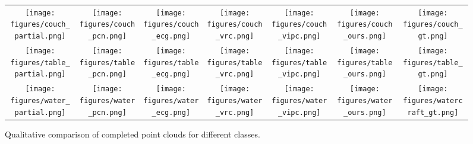 \documentclass{article}
\begin{document}
\begin{figure}
\begin{tabular}{ccccccc}
\\
\texttt{[image: figures/couch\_partial.png]}
   
&
\texttt{[image: figures/couch\_pcn.png]}
   
&
\texttt{[image: figures/couch\_ecg.png]}
   
&
\texttt{[image: figures/couch\_vrc.png]}
   
&
\texttt{[image: figures/couch\_vipc.png]}
   
&
\texttt{[image: figures/couch\_ours.png]}
   
&
\texttt{[image: figures/couch\_gt.png]}

\\
\texttt{[image: figures/table\_partial.png]}
   
&
\texttt{[image: figures/table\_pcn.png]}
   
&
\texttt{[image: figures/table\_ecg.png]}
   
&
\texttt{[image: figures/table\_vrc.png]}
   
&
\texttt{[image: figures/table\_vipc.png]}
   
&
\texttt{[image: figures/table\_ours.png]}
   
&
\texttt{[image: figures/table\_gt.png]}

\\
\texttt{[image: figures/water\_partial.png]}
   
&
\texttt{[image: figures/water\_pcn.png]}
   
&
\texttt{[image: figures/water\_ecg.png]}
   
&
\texttt{[image: figures/water\_vrc.png]}
   
&
\texttt{[image: figures/water\_vipc.png]}
   
&
\texttt{[image: figures/water\_ours.png]}
   
&
\texttt{[image: figures/watercraft\_gt.png]}

\\

\end{tabular}
\caption{Qualitative comparison of completed point clouds for different classes.}
\label{fig:qualitative}
\end{figure}
\end{document}
